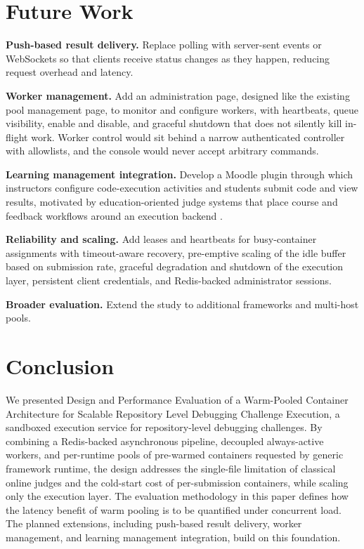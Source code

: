 \documentclass[conference]{IEEEtran}
\begin{document}
\section{Future Work}
\textbf{Push-based result delivery.} Replace polling with server-sent events or WebSockets so that clients receive status changes as they happen, reducing request overhead and latency.

\textbf{Worker management.} Add an administration page, designed like the existing pool management page, to monitor and configure workers, with heartbeats, queue visibility, enable and disable, and graceful shutdown that does not silently kill in-flight work. Worker control would sit behind a narrow authenticated controller with allowlists, and the console would never accept arbitrary commands.

\textbf{Learning management integration.} Develop a Moodle plugin through which instructors configure code-execution activities and students submit code and view results, motivated by education-oriented judge systems that place course and feedback workflows around an execution backend \cite{kim2022}.

\textbf{Reliability and scaling.} Add leases and heartbeats for busy-container assignments with timeout-aware recovery, pre-emptive scaling of the idle buffer based on submission rate, graceful degradation and shutdown of the execution layer, persistent client credentials, and Redis-backed administrator sessions.

\textbf{Broader evaluation.} Extend the study to additional frameworks and multi-host pools.

\section{Conclusion}
We presented Design and Performance Evaluation of a Warm-Pooled Container Architecture for Scalable Repository Level Debugging Challenge Execution, a sandboxed execution service for repository-level debugging challenges. By combining a Redis-backed asynchronous pipeline, decoupled always-active workers, and per-runtime pools of pre-warmed containers requested by generic framework runtime, the design addresses the single-file limitation of classical online judges and the cold-start cost of per-submission containers, while scaling only the execution layer. The evaluation methodology in this paper defines how the latency benefit of warm pooling is to be quantified under concurrent load. The planned extensions, including push-based result delivery, worker management, and learning management integration, build on this foundation.
\end{document}
